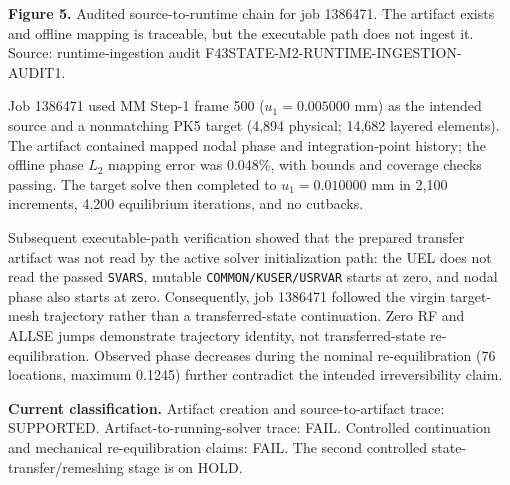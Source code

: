 \documentclass[11pt,a4paper]{article}
\newcommand{\boxx}[2]{\colorbox{#1}{\parbox{\dimexpr\linewidth-2\fboxsep}{#2}}}
\newcommand{\headx}[1]{{\color{navy}\fontsize{17}{20}\selectfont\bfseries #1}\par\vspace{1.5mm}{\color{blue}\rule{\linewidth}{1.1pt}}\vspace{3mm}}
\newcommand{\captionfont}{\fontsize{9.5}{11.5}\selectfont}
\begin{document}
\clearpage\headx{6. State transfer and the restart claim audit}
\begin{center}
\end{center}
\captionfont\textbf{Figure 5.} Audited source-to-runtime chain for job 1386471. The artifact exists and offline mapping is traceable, but the executable path does not ingest it. Source: runtime-ingestion audit F43STATE-M2-RUNTIME-INGESTION-AUDIT1.\par
\normalsize
Job 1386471 used MM Step-1 frame 500 ($u_1=0.005000$ mm) as the intended source and a nonmatching PK5 target (4,894 physical; 14,682 layered elements). The artifact contained mapped nodal phase and integration-point history; the offline phase $L_2$ mapping error was 0.048\%, with bounds and coverage checks passing. The target solve then completed to $u_1=0.010000$ mm in 2,100 increments, 4,200 equilibrium iterations, and no cutbacks.

Subsequent executable-path verification showed that the prepared transfer artifact was not read by the active solver initialization path: the UEL does not read the passed \texttt{SVARS}, mutable \texttt{COMMON/KUSER/USRVAR} starts at zero, and nodal phase also starts at zero. Consequently, job 1386471 followed the virgin target-mesh trajectory rather than a transferred-state continuation. Zero RF and ALLSE jumps demonstrate trajectory identity, not transferred-state re-equilibration. Observed phase decreases during the nominal re-equilibration (76 locations, maximum 0.1245) further contradict the intended irreversibility claim.
\boxx{pr}{\textbf{Current classification.} Artifact creation and source-to-artifact trace: SUPPORTED. Artifact-to-running-solver trace: FAIL. Controlled continuation and mechanical re-equilibration claims: FAIL. The second controlled state-transfer/remeshing stage is on HOLD.}
\end{document}
